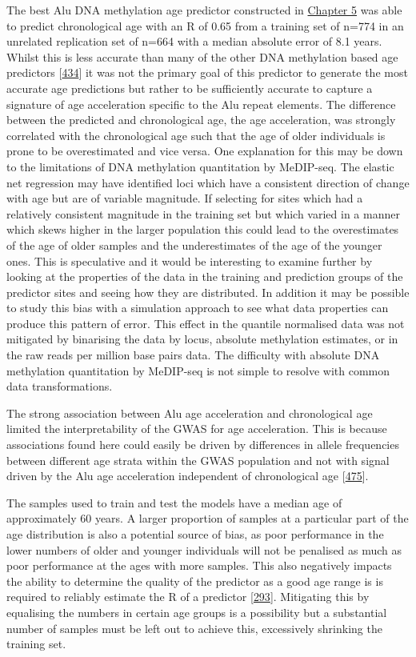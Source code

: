 \documentclass[
]{book}
\begin{document}
The best Alu DNA methylation age predictor constructed in \protect\hyperlink{Alus}{Chapter 5} was able to predict chronological age with an R of 0.65 from a training set of n=774 in an unrelated replication set of n=664 with a median absolute error of 8.1 years.
Whilst this is less accurate than many of the other DNA methylation based age predictors {[}\protect\hyperlink{ref-Bell2019}{434}{]} it was not the primary goal of this predictor to generate the most accurate age predictions but rather to be sufficiently accurate to capture a signature of age acceleration specific to the Alu repeat elements.
The difference between the predicted and chronological age, the age acceleration, was strongly correlated with the chronological age such that the age of older individuals is prone to be overestimated and vice versa.
One explanation for this may be down to the limitations of DNA methylation quantitation by MeDIP-seq.
The elastic net regression may have identified loci which have a consistent direction of change with age but are of variable magnitude.
If selecting for sites which had a relatively consistent magnitude in the training set but which varied in a manner which skews higher in the larger population this could lead to the overestimates of the age of older samples and the underestimates of the age of the younger ones.
This is speculative and it would be interesting to examine further by looking at the properties of the data in the training and prediction groups of the predictor sites and seeing how they are distributed.
In addition it may be possible to study this bias with a simulation approach to see what data properties can produce this pattern of error.
This effect in the quantile normalised data was not mitigated by binarising the data by locus, absolute methylation estimates, or in the raw reads per million base pairs data.
The difficulty with absolute DNA methylation quantitation by MeDIP-seq is not simple to resolve with common data transformations.

The strong association between Alu age acceleration and chronological age limited the interpretability of the GWAS for age acceleration.
This is because associations found here could easily be driven by differences in allele frequencies between different age strata within the GWAS population and not with signal driven by the Alu age acceleration independent of chronological age {[}\protect\hyperlink{ref-Price2010}{475}{]}.

The samples used to train and test the models have a median age of approximately 60 years.
A larger proportion of samples at a particular part of the age distribution is also a potential source of bias, as poor performance in the lower numbers of older and younger individuals will not be penalised as much as poor performance at the ages with more samples.
This also negatively impacts the ability to determine the quality of the predictor as a good age range is is required to reliably estimate the R of a predictor {[}\protect\hyperlink{ref-Horvath2018}{293}{]}.
Mitigating this by equalising the numbers in certain age groups is a possibility but a substantial number of samples must be left out to achieve this, excessively shrinking the training set.
\end{document}
